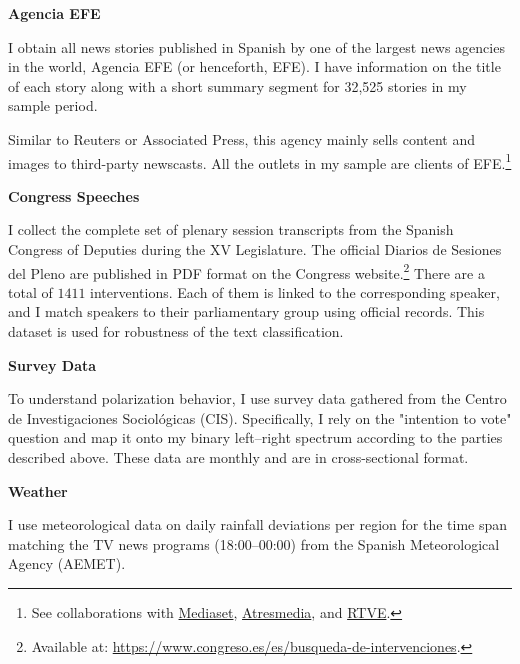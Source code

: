 \documentclass[12pt]{article}
\begin{document}
	

	
	\textbf{Agencia EFE}
	
	I obtain all news stories published in Spanish by one of the largest news agencies in the world, Agencia EFE (or henceforth, EFE). I have information on the title of each story along with a short summary segment for  32,525 stories in my sample period.
	
	Similar to Reuters or Associated Press, this agency mainly sells content and images to third-party newscasts. All the outlets in my sample are clients of  EFE.\footnote{See collaborations with \href{https://www.telecinco.es/autores/agencia-efe/}{Mediaset}, \href{https://cadenaser.com/nacional/2024/09/22/el-teletexto-una-herramienta-olvidada-que-aun-perdura-en-nuestras-televisiones-cadena-ser/}{Atresmedia}, and \href{https://www.rtve.es/rtve/20130301/rtve-agencia-efe-firman-convenio-colaboracion/611440.shtml}{RTVE}.} 


	\textbf{Congress Speeches}

 I collect the complete set of plenary session transcripts from the Spanish Congress of Deputies during the XV Legislature. The official Diarios de Sesiones del Pleno are published in PDF format on the Congress website.\footnote{Available at: \url{https://www.congreso.es/es/busqueda-de-intervenciones}.} There are a total of $1411$ interventions. Each of them is linked to the corresponding speaker, and I match speakers to their parliamentary group using official records. This dataset is used for robustness of the text classification. 

	
	\textbf{Survey Data}
	
	To understand polarization behavior, I use survey data gathered from the Centro de Investigaciones Sociológicas (CIS). Specifically, I rely on the "intention to vote" question and map it onto my binary left–right spectrum according to the parties described above. These data are monthly and are in cross-sectional format.
	
	\textbf{Weather}
	
	I use meteorological data on daily rainfall deviations per region for the time span matching the TV news programs (18:00–00:00) from the Spanish Meteorological Agency (AEMET).
	
\end{document}
